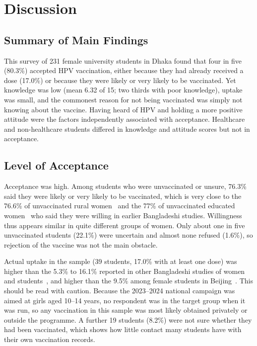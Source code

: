 \chapter{Discussion}

\section{Summary of Main Findings}
This survey of 231 female university students in Dhaka found that four in five (80.3\%) accepted HPV vaccination, either because they had already received a dose (17.0\%) or because they were likely or very likely to be vaccinated. Yet knowledge was low (mean 6.32 of 15; two thirds with poor knowledge), uptake was small, and the commonest reason for not being vaccinated was simply not knowing about the vaccine. Having heard of HPV and holding a more positive attitude were the factors independently associated with acceptance. Healthcare and non-healthcare students differed in knowledge and attitude scores but not in acceptance.

\section{Level of Acceptance}
Acceptance was high. Among students who were unvaccinated or unsure, 76.3\% said they were likely or very likely to be vaccinated, which is very close to the 76.6\% of unvaccinated rural women~\cite{banik2022} and the 77\% of unvaccinated educated women~\cite{taniya2023} who said they were willing in earlier Bangladeshi studies. Willingness thus appears similar in quite different groups of women. Only about one in five unvaccinated students (22.1\%) were uncertain and almost none refused (1.6\%), so rejection of the vaccine was not the main obstacle.

Actual uptake in the sample (39 students, 17.0\% with at least one dose) was higher than the 5.3\% to 16.1\% reported in other Bangladeshi studies of women and students~\cite{banik2022,taniya2023,chowdhury2022,promi2025}, and higher than the 9.5\% among female students in Beijing~\cite{liu2020}. This should be read with caution. Because the 2023--2024 national campaign was aimed at girls aged 10--14 years, no respondent was in the target group when it was run, so any vaccination in this sample was most likely obtained privately or outside the programme. A further 19 students (8.2\%) were not sure whether they had been vaccinated, which shows how little contact many students have with their own vaccination records.


